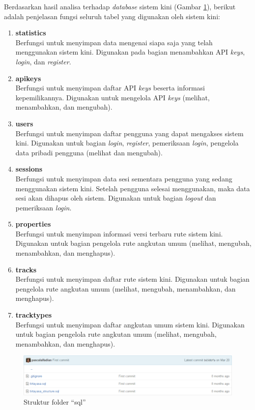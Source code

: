 Berdasarkan hasil analisa terhadap \textit{database} sistem kini (Gambar \ref{fig:4_struktursql}), berikut adalah penjelasan fungsi seluruh tabel yang digunakan oleh sistem kini:
\begin{enumerate}
	\item \textbf{statistics}\\
	Berfungsi untuk menyimpan data mengenai siapa saja yang telah menggunakan sistem kini. Digunakan pada bagian menambahkan API \textit{keys}, \textit{login}, dan \textit{register}. 
	\item \textbf{apikeys}\\
	Berfungsi untuk menyimpan daftar API \textit{keys} beserta informasi kepemilikannya. Digunakan untuk mengelola API \textit{keys} (melihat, menambahkan, dan mengubah). 
	\item \textbf{users}\\
	Berfungsi untuk menyimpan daftar pengguna yang dapat mengakses sistem kini. Digunakan untuk bagian \textit{login}, \textit{register}, pemeriksaan \textit{login}, pengelola data pribadi pengguna (melihat dan mengubah). 
	\item \textbf{sessions}\\
	Berfungsi untuk menyimpan data sesi sementara pengguna yang sedang menggunakan sistem kini. Setelah pengguna selesai menggunakan, maka data sesi akan dihapus oleh sistem. Digunakan untuk bagian \textit{logout} dan pemeriksaan \textit{login}. 
	\item \textbf{properties}\\
	Berfungsi untuk menyimpan informasi versi terbaru rute sistem kini. Digunakan untuk bagian pengelola rute angkutan umum (melihat, mengubah, menambahkan, dan menghapus).
	\item \textbf{tracks}\\
	Berfungsi untuk menyimpan daftar rute sistem kini. Digunakan untuk bagian pengelola rute angkutan umum (melihat, mengubah, menambahkan, dan menghapus).
	\item \textbf{tracktypes}\\
	Berfungsi untuk menyimpan daftar angkutan umum sistem kini. Digunakan untuk bagian pengelola rute angkutan umum (melihat, mengubah, menambahkan, dan menghapus).
\end{enumerate}

\begin{figure}[htbp]
	\centering
		\includegraphics[scale=0.5]{Gambar/4_struktursql.png}
	\caption{Struktur folder ``sql''}
	\label{fig:4_struktursql}
\end{figure}

